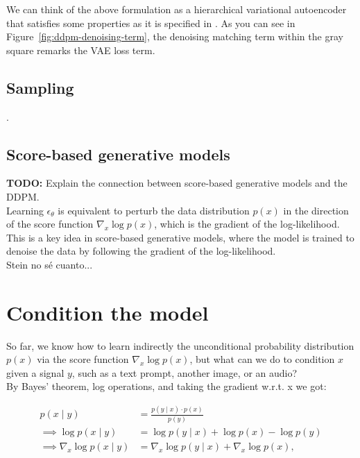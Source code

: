 


We can think of the above formulation as a hierarchical variational autoencoder that satisfies some properties as it is specified in \citep{luo2022understanding}.  As you can see in Figure~\ref{fig:ddpm-denoising-term}, the denoising matching term within the gray square remarks the VAE loss term. 


\subsection{Sampling}

.

\subsection{Score-based generative models}

\textbf{TODO:} Explain the connection between score-based generative models and the DDPM.\\

Learning $\epsilon_{\theta}$ is equivalent to perturb the data distribution $p(x)$ in the direction of the score function $\nabla_{x}\log p(x)$, which is the gradient of the log-likelihood. This is a key idea in score-based generative models, where the model is trained to denoise the data by following the gradient of the log-likelihood.\\

Stein no sé cuanto...

    
\section{Condition the model}


So far, we know how to learn indirectly the unconditional probability distribution $p(x)$ via the score function $\nabla_{x}\log p(x)$, but what can we do to condition $x$ given a signal $y$, such as a text prompt, another image, or an audio?\\

By Bayes' theorem, log operations, and taking the gradient w.r.t. x we got:

    \begin{equation}
         \begin{split}
            p(x \mid y) &= \frac{p(y \mid x) \cdot p(x)}{p(y)}\\
            \implies \log p(x \mid y) &= \log p(y \mid x) + \log p(x) - \log p(y) \\
            \implies \nabla_x \log p(x \mid y) &= \nabla_x \log p(y \mid x) + \nabla_x \log p(x) ,
        \end{split}
    \end{equation}
    

